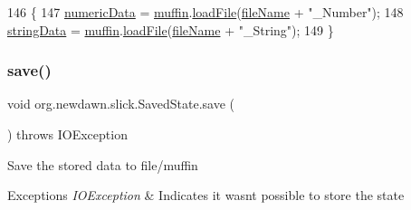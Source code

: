 \begin{DoxyCode}
146                                           \{
147         \mbox{\hyperlink{classorg_1_1newdawn_1_1slick_1_1_saved_state_ad734be75c78cdbd06ed020c7d416e187}{numericData}} = \mbox{\hyperlink{classorg_1_1newdawn_1_1slick_1_1_saved_state_a461d13c1acfff7fbc631724ff5fae6a1}{muffin}}.\mbox{\hyperlink{interfaceorg_1_1newdawn_1_1slick_1_1muffin_1_1_muffin_a2d6256b6d8f26b294f06341985047fbe}{loadFile}}(\mbox{\hyperlink{classorg_1_1newdawn_1_1slick_1_1_saved_state_ace5c7436bfdba5164f2b1826bb173388}{fileName}} + \textcolor{stringliteral}{"\_Number"});
148         \mbox{\hyperlink{classorg_1_1newdawn_1_1slick_1_1_saved_state_a5c7e1053721ddfee0b4a2a29facd103b}{stringData}} = \mbox{\hyperlink{classorg_1_1newdawn_1_1slick_1_1_saved_state_a461d13c1acfff7fbc631724ff5fae6a1}{muffin}}.\mbox{\hyperlink{interfaceorg_1_1newdawn_1_1slick_1_1muffin_1_1_muffin_a2d6256b6d8f26b294f06341985047fbe}{loadFile}}(\mbox{\hyperlink{classorg_1_1newdawn_1_1slick_1_1_saved_state_ace5c7436bfdba5164f2b1826bb173388}{fileName}} + \textcolor{stringliteral}{"\_String"});
149     \}
\end{DoxyCode}
\mbox{\label{classorg_1_1newdawn_1_1slick_1_1_saved_state_aa611e00cc3b27ac35104a970c41791f8}} 
\subsubsection{\texorpdfstring{save()}{save()}}
{\footnotesize\ttfamily void org.\+newdawn.\+slick.\+Saved\+State.\+save (\begin{DoxyParamCaption}{ }\end{DoxyParamCaption}) throws I\+O\+Exception\hspace{0.3cm}{\ttfamily [inline]}}

Save the stored data to file/muffin


\begin{DoxyExceptions}{Exceptions}
{\em I\+O\+Exception} & Indicates it wasn\textquotesingle{}t possible to store the state \\
\hline
\end{DoxyExceptions}

